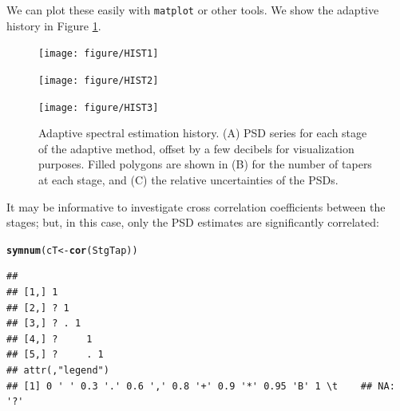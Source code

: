 \documentclass[10pt]{article}\usepackage{graphicx, color}
\makeatletter
\newcommand{\hlfunctioncall}[1]{\textcolor[rgb]{0.501960784313725,0,0.329411764705882}{\textbf{#1}}}%
\newenvironment{kframe}{%
 \def\at@end@of@kframe{}%
 \ifinner\ifhmode%
  \def\at@end@of@kframe{\end{minipage}}%
  \begin{minipage}{\columnwidth}%
 \fi\fi%
 \def\FrameCommand##1{\hskip\@totalleftmargin \hskip-\fboxsep
 \colorbox{shadecolor}{##1}\hskip-\fboxsep
     \hskip-\linewidth \hskip-\@totalleftmargin \hskip\columnwidth}%
 \MakeFramed {\advance\hsize-\width
   \@totalleftmargin\z@ \linewidth\hsize
   \@setminipage}}%
 {\par\unskip\endMakeFramed%
 \at@end@of@kframe}
\newenvironment{knitrout}{}{} %
\newcommand{\Rcmd}[1]{\texttt{#1}}
\makeatother
\begin{document}
We can plot these easily with \Rcmd{matplot} or other tools.  We show
the adaptive history in
Figure \ref{fig:psdhist}.  

\begin{figure}[htb!]
\begin{center}
\begin{knitrout}
\color{fgcolor}
\texttt{[image: figure/HIST1]} 

\end{knitrout}

\begin{knitrout}
\color{fgcolor}
\texttt{[image: figure/HIST2]} 

\end{knitrout}

\begin{knitrout}
\color{fgcolor}
\texttt{[image: figure/HIST3]} 

\end{knitrout}


\caption{Adaptive spectral estimation history.
(A) PSD series for each stage of the adaptive method, 
offset by a few decibels for visualization purposes.
Filled polygons are shown in (B) for the number of tapers at each stage,
and (C) the relative uncertainties of the PSDs.
}
\label{fig:psdhist}
\end{center}
\end{figure}

It may be informative to investigate cross correlation
coefficients between the stages;
but, in this case, only the PSD estimates are significantly correlated:
\begin{knitrout}
\color{fgcolor}\begin{kframe}
\begin{alltt}
\hlfunctioncall{symnum}(cT <- \hlfunctioncall{cor}(StgTap))
\end{alltt}


{\ttfamily\noindent\color{warningcolor}{\#\# Warning: the standard deviation is zero}}\begin{verbatim}
##               
## [1,] 1        
## [2,] ? 1      
## [3,] ? . 1    
## [4,] ?     1  
## [5,] ?     . 1
## attr(,"legend")
## [1] 0 ' ' 0.3 '.' 0.6 ',' 0.8 '+' 0.9 '*' 0.95 'B' 1 \t    ## NA: '?'
\end{verbatim}
\end{kframe}
\end{knitrout}
\end{document}
